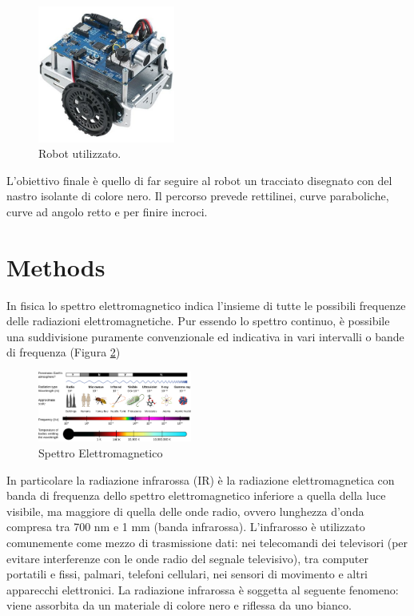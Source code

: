 \documentclass[twoside,twocolumn]{article}
\begin{document}
\begin{figure}[h]
	\centering
	\includegraphics[width=0.4\textwidth]{immagini/robot}
	\caption{Robot utilizzato.}
	\label{fig:robot}
\end{figure}

L'obiettivo finale è quello di far seguire al robot un tracciato disegnato con del nastro isolante di colore nero. Il percorso prevede rettilinei, curve paraboliche, curve ad angolo retto e per finire incroci.

\section{Methods}

In fisica lo spettro elettromagnetico indica l'insieme di tutte le possibili frequenze delle radiazioni elettromagnetiche. Pur essendo lo spettro continuo, è possibile una suddivisione puramente convenzionale ed indicativa in vari intervalli o bande di frequenza (Figura \ref{fig:spettro})

\begin{figure}[h]
	\centering
	\includegraphics[width=0.45\textwidth]{immagini/spettro}
	\caption{Spettro Elettromagnetico}
	\label{fig:spettro}
\end{figure}

In particolare la radiazione infrarossa (IR) è la radiazione elettromagnetica con banda di frequenza dello spettro elettromagnetico inferiore a quella della luce visibile, ma maggiore di quella delle onde radio, ovvero lunghezza d'onda compresa tra 700 nm e 1 mm (banda infrarossa).
L'infrarosso è utilizzato comunemente come mezzo di trasmissione dati: nei telecomandi dei televisori (per evitare interferenze con le onde radio del segnale televisivo), tra computer portatili e fissi, palmari, telefoni cellulari, nei sensori di movimento e altri apparecchi elettronici. La radiazione infrarossa è soggetta al seguente fenomeno: viene assorbita da un materiale di colore nero e riflessa da uno bianco. 
\end{document}
